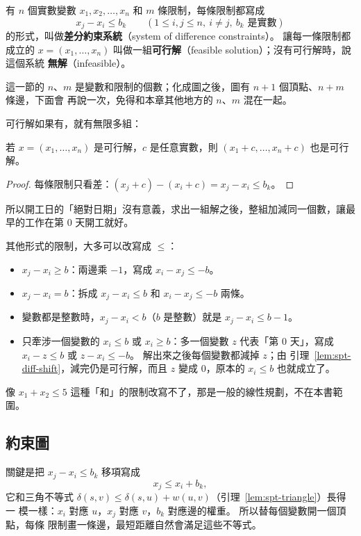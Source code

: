 \begin{definition}[差分約束系統]
\label{def:spt-diff}
有 $n$ 個實數變數 $x_1, x_2, \ldots, x_n$ 和 $m$ 條限制，每條限制都寫成
\[
x_j - x_i \le b_k \qquad (1 \le i, j \le n,\ i \ne j,\ b_k \text{ 是實數})
\]
的形式，叫做\textbf{差分約束系統}（system of difference constraints）。 讓每一條限制都成立的
$x = (x_1, \ldots, x_n)$ 叫做一組\textbf{可行解}（feasible solution）；沒有可行解時，說這個系統
\textbf{無解}（infeasible）。
\end{definition}

這一節的 $n$、$m$ 是變數和限制的個數；化成圖之後，圖有 $n + 1$ 個頂點、$n + m$ 條邊，下面會
再說一次，免得和本章其他地方的 $n$、$m$ 混在一起。

可行解如果有，就有無限多組：
\begin{lemma}
\label{lem:spt-diff-shift}
若 $x = (x_1, \ldots, x_n)$ 是可行解，$c$ 是任意實數，則 $(x_1 + c, \ldots, x_n + c)$ 也是可行解。
\end{lemma}

\begin{proof}
每條限制只看差：$(x_j + c) - (x_i + c) = x_j - x_i \le b_k$。
\end{proof}

所以開工日的「絕對日期」沒有意義，求出一組解之後，整組加減同一個數，讓最早的工作在第 $0$
天開工就好。

其他形式的限制，大多可以改寫成 $\le$：
\begin{itemize}
\item $x_j - x_i \ge b$：兩邊乘 $-1$，寫成 $x_i - x_j \le -b$。
\item $x_j - x_i = b$：拆成 $x_j - x_i \le b$ 和 $x_i - x_j \le -b$ 兩條。
\item 變數都是整數時，$x_j - x_i < b$（$b$ 是整數）就是 $x_j - x_i \le b - 1$。
\item 只牽涉一個變數的 $x_i \le b$ 或 $x_i \ge b$：多一個變數 $z$ 代表「第 $0$ 天」，寫成
$x_i - z \le b$ 或 $z - x_i \le -b$。 解出來之後每個變數都減掉 $z$；由
引理~\ref{lem:spt-diff-shift}，減完仍是可行解，而且 $z$ 變成 $0$，原本的 $x_i \le b$ 也就成立了。
\end{itemize}
像 $x_1 + x_2 \le 5$ 這種「和」的限制改寫不了，那是一般的線性規劃，不在本書範圍。

\subsection{約束圖}

關鍵是把 $x_j - x_i \le b_k$ 移項寫成
\[
x_j \le x_i + b_k ,
\]
它和三角不等式 $\delta(s, v) \le \delta(s, u) + w(u, v)$（引理~\ref{lem:spt-triangle}）長得一
模一樣：$x_i$ 對應 $u$，$x_j$ 對應 $v$，$b_k$ 對應邊的權重。 所以替每個變數開一個頂點，每條
限制畫一條邊，最短距離自然會滿足這些不等式。

